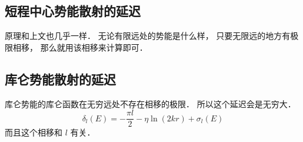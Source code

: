 \subsection{短程中心势能散射的延迟}

原理和上文也几乎一样． 无论有限远处的势能是什么样， 只要无限远的地方有极限相移， 那么就用该相移来计算即可．

\subsection{库仑势能散射的延迟}
库仑势能的库仑函数在无穷远处不存在相移的极限． 所以这个延迟会是无穷大．
\begin{equation}
\delta_l(E) =  - \frac{\pi l}{2} - \eta\ln(2kr) + \sigma_l(E)
\end{equation}
而且这个相移和 $l$ 有关．

